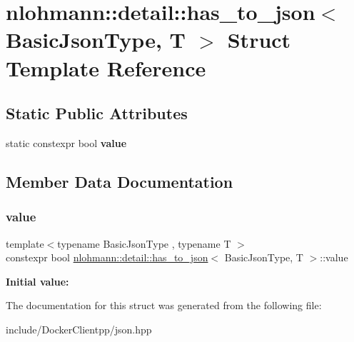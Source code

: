 \hypertarget{structnlohmann_1_1detail_1_1has__to__json}{}\section{nlohmann\+::detail\+::has\+\_\+to\+\_\+json$<$ Basic\+Json\+Type, T $>$ Struct Template Reference}
\label{structnlohmann_1_1detail_1_1has__to__json}
\subsection*{Static Public Attributes}
\begin{DoxyCompactItemize}
\item 
static constexpr bool {\bfseries value}
\end{DoxyCompactItemize}


\subsection{Member Data Documentation}
\mbox{\label{structnlohmann_1_1detail_1_1has__to__json_a18e260c3c6f10328637c4427d3cb3a31}} 
\subsubsection{\texorpdfstring{value}{value}}
{\footnotesize\ttfamily template$<$typename Basic\+Json\+Type , typename T $>$ \\
constexpr bool \mbox{\hyperlink{structnlohmann_1_1detail_1_1has__to__json}{nlohmann\+::detail\+::has\+\_\+to\+\_\+json}}$<$ Basic\+Json\+Type, T $>$\+::value\hspace{0.3cm}{\ttfamily [static]}}

{\bfseries Initial value\+:}
\begin{DoxyCode}{0}

\end{DoxyCode}


The documentation for this struct was generated from the following file\+:\begin{DoxyCompactItemize}
\item 
include/\+Docker\+Clientpp/json.\+hpp\end{DoxyCompactItemize}
